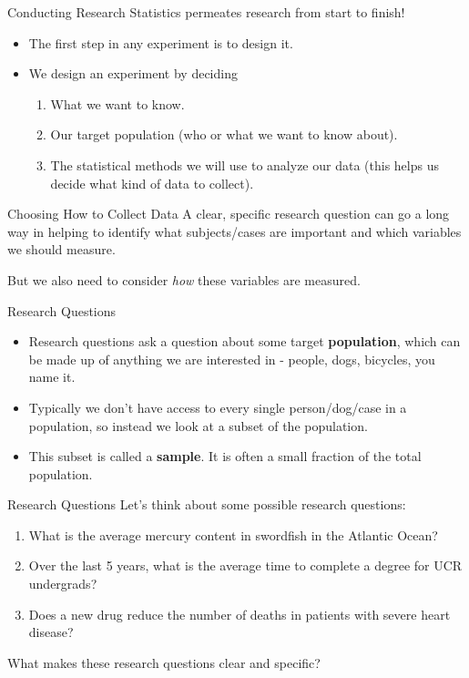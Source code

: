 \begin{frame}{Conducting Research}
    Statistics permeates research from start to finish! 
    \begin{itemize}
        \item The first step in any experiment is to design it.
        \item We design an experiment by deciding
        \begin{enumerate}
            \item What we want to know.
            \item Our target population (who or what we want to know about).
            \item The statistical methods we will use to analyze our data (this helps us decide what kind of data to collect).
        \end{enumerate}
    \end{itemize}
\end{frame}

\begin{frame}{Choosing How to Collect Data}
    A clear, specific research question can go a long way in helping to identify what subjects/cases are important and which variables we should measure. 
    
    \vspace{12pt}
    But we also need to consider \textit{how} these variables are measured.
\end{frame}

\begin{frame}{Research Questions}
    \begin{itemize}
        \item Research questions ask a question about some target \textbf{population}, which can be made up of anything we are interested in - people, dogs, bicycles, you name it.
        \item Typically we don't have access to every single person/dog/case in a population, so instead we look at a subset of the population. 
        \item This subset is called a \textbf{sample}. It is often a small fraction of the total population.  
    \end{itemize}
\end{frame}

\begin{frame}{Research Questions}
    Let's think about some possible research questions:
    \begin{enumerate}
        \item What is the average mercury content in swordfish in the Atlantic Ocean?
        \item Over the last 5 years, what is the average time to complete a degree for UCR undergrads?
        \item Does a new drug reduce the number of deaths in patients with severe heart disease?
    \end{enumerate}
    
    \vspace{12pt}
    What makes these research questions clear and specific? 
\end{frame}

